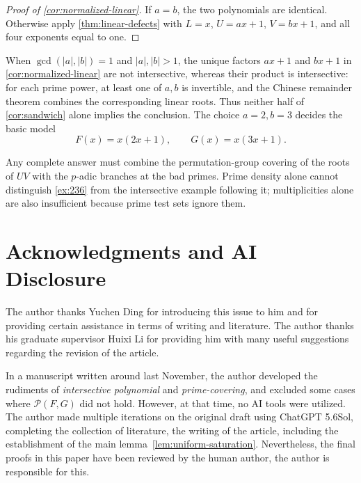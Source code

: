 \documentclass[11pt]{amsart}
\newcommand{\cP}{\mathcal P}
\newtheorem{question}[theorem]{Question}
\theoremstyle{definition}
\begin{document}
\begin{proof}[Proof of \cref{cor:normalized-linear}]
If \(a=b\), the two polynomials are identical.  Otherwise apply
\cref{thm:linear-defects} with \(L=x\), \(U=ax+1\), \(V=bx+1\), and all
four exponents equal to one.
\end{proof}

When \(\gcd(|a|,|b|)=1\) and \(|a|,|b|>1\), the unique factors \(ax+1\)
and \(bx+1\) in \cref{cor:normalized-linear} are not intersective, whereas
their product is intersective: for each prime power, at least one of \(a,b\)
is invertible, and the Chinese remainder theorem combines the corresponding
linear roots.
Thus neither half of \cref{cor:sandwich} alone implies the conclusion.  The
choice \(a=2,b=3\) decides the basic model
\[
  F(x)=x(2x+1),\qquad G(x)=x(3x+1).
\]


Any complete answer must combine the permutation-group covering of the roots
of \(UV\) with the \(p\)-adic branches at the bad primes.  Prime density alone
cannot distinguish \cref{ex:236} from the intersective example following it;
multiplicities alone are also insufficient because prime test sets ignore
them.

\section{Acknowledgments and AI Disclosure}
  The author thanks Yuchen Ding for introducing this issue to him and for providing certain assistance in terms of writing and literature. The author thanks his graduate supervisor Huixi Li for providing him with many useful suggestions regarding the revision of the article.
  
  In a manuscript written around last November, the author developed the rudiments of \textit{intersective polynomial} and \textit{prime-covering}, and excluded some cases where \(\cP(F,G)\) did not hold. However, at that time, no AI tools were utilized. The author made multiple iterations on the original draft using ChatGPT 5.6Sol, completing the collection of literature, the writing of the article, including the establishment of the main lemma~\ref{lem:uniform-saturation}. Nevertheless, the final proofs in this paper have been reviewed by the human author, the author is responsible for this.
\end{document}
